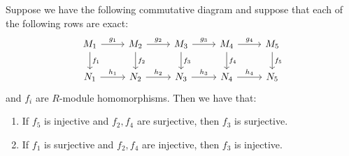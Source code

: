 \begin{pro} 
Suppose we have the following commutative diagram and suppose that each of the following rows are exact:
    \[\begin{tikzcd}[sep=small]
	{M_1} && {M_2} && {M_3} && {M_4} && {M_5} \\
	\\
	{N_1} && {N_2} && {N_3} && {N_4} && {N_5}
	\arrow["{g_1}", from=1-1, to=1-3]
	\arrow["{f_1}", from=1-1, to=3-1]
	\arrow["{g_2}", from=1-3, to=1-5]
	\arrow["{f_2}", from=1-3, to=3-3]
	\arrow["{g_3}", from=1-5, to=1-7]
	\arrow["{f_3}", from=1-5, to=3-5]
	\arrow["{g_4}", from=1-7, to=1-9]
	\arrow["{f_4}", from=1-7, to=3-7]
	\arrow["{f_5}", from=1-9, to=3-9]
	\arrow["{h_1}", from=3-1, to=3-3]
	\arrow["{h_2}", from=3-3, to=3-5]
	\arrow["{h_3}", from=3-5, to=3-7]
	\arrow["{h_4}", from=3-7, to=3-9]
\end{tikzcd}\]
and $f_i$ are $R$-module homomorphisms. Then we have that:
\begin{enumerate}
    \item If $f_5$ is injective and $f_2, f_4$ are surjective, then $f_3$ is surjective.
    \item If $f_1$ is surjective and $f_2, f_4$ are injective, then $f_3$ is injective.
\end{enumerate}
\end{pro}
